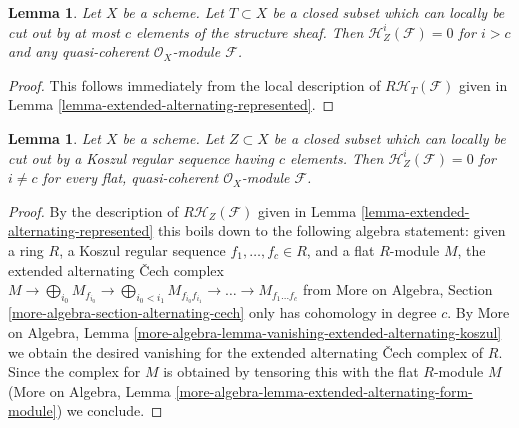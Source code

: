\documentclass{stacks-project}
\theoremstyle{plain}
\newtheorem{lemma}[subsection]{Lemma}
\theoremstyle{definition}
\theoremstyle{remark}
\numberwithin{equation}{subsection}
\begin{document}
\begin{lemma}
\label{lemma-supported-trivial-vanishing}
Let $X$ be a scheme. Let $T \subset X$ be a closed subset which can
locally be cut out by at most $c$ elements of the structure sheaf.
Then $\mathcal{H}^i_Z(\mathcal{F}) = 0$ for $i > c$ and any
quasi-coherent $\mathcal{O}_X$-module $\mathcal{F}$.
\end{lemma}

\begin{proof}
This follows immediately from the local description of
$R\mathcal{H}_T(\mathcal{F})$ given in
Lemma \ref{lemma-extended-alternating-represented}.
\end{proof}

\begin{lemma}
\label{lemma-supported-vanishing}
Let $X$ be a scheme. Let $Z \subset X$ be a closed subset which can
locally be cut out by a Koszul regular sequence having $c$ elements.
Then $\mathcal{H}^i_Z(\mathcal{F}) = 0$ for $i \not = c$ for every
flat, quasi-coherent $\mathcal{O}_X$-module $\mathcal{F}$.
\end{lemma}

\begin{proof}
By the description of $R\mathcal{H}_Z(\mathcal{F})$ given in
Lemma \ref{lemma-extended-alternating-represented} this boils
down to the following algebra statement: given a ring $R$,
a Koszul regular sequence $f_1, \ldots, f_c \in R$, and a flat
$R$-module $M$, the extended alternating {\v C}ech complex
$M \to \bigoplus\nolimits_{i_0} M_{f_{i_0}} \to
\bigoplus\nolimits_{i_0 < i_1} M_{f_{i_0}f_{i_1}} \to
\ldots \to M_{f_1 \ldots f_c}$
from More on Algebra, Section \ref{more-algebra-section-alternating-cech}
only has cohomology in degree $c$. By More on Algebra, Lemma
\ref{more-algebra-lemma-vanishing-extended-alternating-koszul}
we obtain the desired vanishing for the extended alternating
{\v C}ech complex of $R$. Since the complex for $M$ is obtained
by tensoring this with the flat $R$-module $M$
(More on Algebra, Lemma
\ref{more-algebra-lemma-extended-alternating-form-module})
we conclude.
\end{proof}
\end{document}
